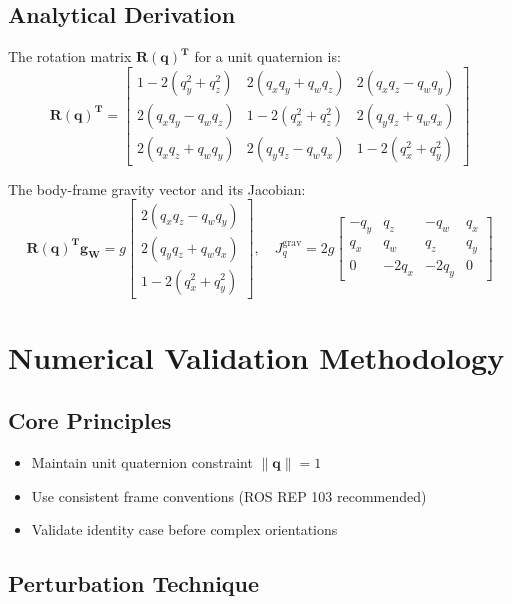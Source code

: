 \documentclass{article}
\begin{document}
\subsection{Analytical Derivation}
\label{subsec:analytical}

The rotation matrix $\mathbf{R(q)^T}$ for a unit quaternion is:
\begin{equation}
	\mathbf{R(q)^T} =
	\begin{bmatrix}
		1-2(q_y^2+q_z^2) & 2(q_xq_y+q_wq_z) & 2(q_xq_z-q_wq_y) \\
		2(q_xq_y-q_wq_z) & 1-2(q_x^2+q_z^2) & 2(q_yq_z+q_wq_x) \\
		2(q_xq_z+q_wq_y) & 2(q_yq_z-q_wq_x) & 1-2(q_x^2+q_y^2)
	\end{bmatrix}
\end{equation}

The body-frame gravity vector and its Jacobian:
\begin{equation}
	\mathbf{R(q)^T g_W} = g\begin{bmatrix}
		2(q_xq_z - q_wq_y) \\
		2(q_yq_z + q_wq_x) \\
		1 - 2(q_x^2 + q_y^2)
	\end{bmatrix}, \quad
	J_q^{\text{grav}} = 2g\begin{bmatrix}
		-q_y & q_z & -q_w & q_x \\
		q_x & q_w & q_z & q_y \\
		0 & -2q_x & -2q_y & 0
	\end{bmatrix}
\end{equation}

\section{Numerical Validation Methodology}
\label{sec:validation}

\subsection{Core Principles}
\begin{itemize}
	\item Maintain unit quaternion constraint $\|\mathbf{q}\|=1$
	\item Use consistent frame conventions (ROS REP 103 recommended)
	\item Validate identity case before complex orientations
\end{itemize}

\subsection{Perturbation Technique}
\label{subsec:perturb}
\end{document}
